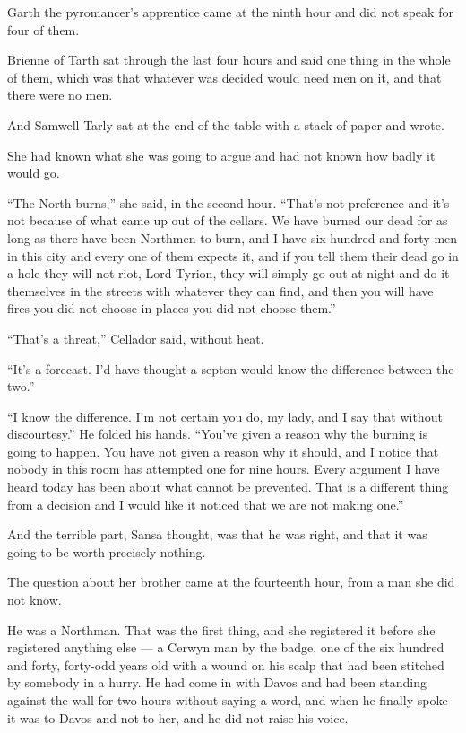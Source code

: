 Garth the pyromancer’s apprentice came at the ninth hour and did not speak for four of them.

Brienne of Tarth sat through the last four hours and said one thing in the whole of them, which was that whatever was decided would need men on it, and that there were no men.

And Samwell Tarly sat at the end of the table with a stack of paper and wrote.

\sceneBreak

She had known what she was going to argue and had not known how badly it would go.

“The North burns,” she said, in the second hour. “That’s not preference and it’s not because of what came up out of the cellars. We have burned our dead for as long as there have been Northmen to burn, and I have six hundred and forty men in this city and every one of them expects it, and if you tell them their dead go in a hole they will not riot, Lord Tyrion, they will simply go out at night and do it themselves in the streets with whatever they can find, and then you will have fires you did not choose in places you did not choose them.”

“That’s a threat,” Cellador said, without heat.

“It’s a forecast. I’d have thought a septon would know the difference between the two.”

“I know the difference. I’m not certain you do, my lady, and I say that without discourtesy.” He folded his hands. “You’ve given a reason why the burning is going to happen. You have not given a reason why it should, and I notice that nobody in this room has attempted one for nine hours. Every argument I have heard today has been about what cannot be prevented. That is a different thing from a decision and I would like it noticed that we are not making one.”

And the terrible part, Sansa thought, was that he was right, and that it was going to be worth precisely nothing.

\sceneBreak

The question about her brother came at the fourteenth hour, from a man she did not know.

He was a Northman. That was the first thing, and she registered it before she registered anything else — a Cerwyn man by the badge, one of the six hundred and forty, forty-odd years old with a wound on his scalp that had been stitched by somebody in a hurry. He had come in with Davos and had been standing against the wall for two hours without saying a word, and when he finally spoke it was to Davos and not to her, and he did not raise his voice.


